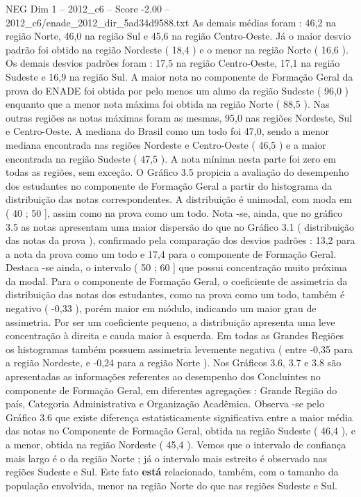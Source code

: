 \begin{textsample}{NEG Dim 1 – 2012\_c6 – Score -2.00 – 2012\_c6/enade\_2012\_dir\_5ad34d9588.txt}
As demais médias foram : 46,2 na região Norte, 46,0 na região Sul e 45,6 na região Centro-Oeste.
Já o maior desvio padrão foi obtido na região Nordeste ( 18,4 ) e o menor na região Norte ( 16,6 ).
Os demais desvios padrões foram : 17,5 na região Centro-Oeste, 17,1 na região Sudeste e 16,9 na região Sul.
A maior nota no componente de Formação Geral da prova do ENADE foi obtida por pelo menos um aluno da região Sudeste ( 96,0 ) enquanto que a menor nota máxima foi obtida na região Norte ( 88,5 ).
Nas outras regiões as notas máximas foram as mesmas, 95,0 nas regiões Nordeste, Sul e Centro-Oeste.
A mediana do Brasil como um todo foi 47,0, sendo a menor mediana encontrada nas regiões Nordeste e Centro-Oeste ( 46,5 ) e a maior encontrada na região Sudeste ( 47,5 ).
A nota mínima nesta parte foi zero em todas as regiões, sem exceção.
O Gráfico 3.5 propicia a avaliação do desempenho dos estudantes no componente de Formação Geral a partir do histograma da distribuição das notas correspondentes.
A distribuição é unimodal, com moda em ( 40 ; 50 ], assim como na prova como um todo.
Nota -se, ainda, que no gráfico 3.5 as notas apresentam uma maior dispersão do que no Gráfico 3.1 ( distribuição das notas da prova ), confirmado pela comparação dos desvios padrões : 13,2 para a nota da prova como um todo e 17,4 para o componente de Formação Geral.
Destaca -se ainda, o intervalo ( 50 ; 60 ] que possui concentração muito próxima da modal.
Para o componente de Formação Geral, o coeficiente de assimetria da distribuição das notas dos estudantes, como na prova como um todo, também é negativo ( -0,33 ), porém maior em módulo, indicando um maior grau de assimetria.
Por ser um coeficiente pequeno, a distribuição apresenta uma leve concentração à direita e cauda maior à esquerda.
Em todas as Grandes Regiões os histogramas também possuem assimetria levemente negativa ( entre -0,35 para a região Nordeste, e -0,24 para a região Norte ).
Nos Gráficos 3.6, 3.7 e 3.8 são apresentadas as informações referentes ao desempenho dos Concluintes no componente de Formação Geral, em diferentes agregações : Grande Região do país, Categoria Administrativa e Organização Acadêmica.
Observa -se pelo Gráfico 3.6 que existe diferença estatisticamente significativa entre a maior média das notas no Componente de Formação Geral, obtida na região Sudeste ( 46,4 ), e a menor, obtida na região Nordeste ( 45,4 ).
Vemos que o intervalo de confiança mais largo é o da região Norte ; já o intervalo mais estreito é observado nas regiões Sudeste e Sul.
Este fato \textbf{está} relacionado, também, com o tamanho da população envolvida, menor na região Norte do que nas regiões Sudeste e Sul.

\end{textsample}
